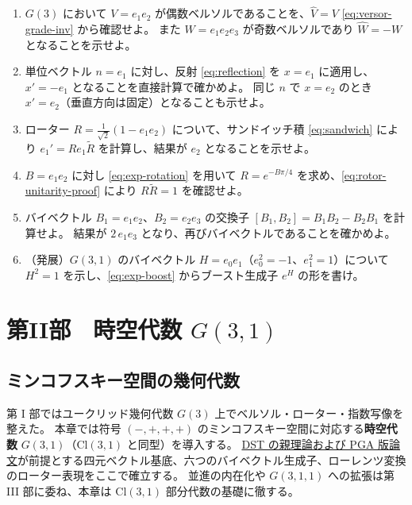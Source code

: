 \documentclass[dvipdfmx,a4paper,oneside]{jsbook}
\numberwithin{equation}{chapter}
\begin{document}
\begin{enumerate}[leftmargin=2em]
  \item \(G(3)\) において \(V = e_1 e_2\) が偶数ベルソルであることを、\(\widehat{V} = V\) \eqref{eq:versor-grade-inv} から確認せよ。
  また \(W = e_1 e_2 e_3\) が奇数ベルソルであり \(\widehat{W} = -W\) となることを示せよ。

  \item 単位ベクトル \(n = e_1\) に対し、反射 \eqref{eq:reflection} を \(x = e_1\) に適用し、\(x' = -e_1\) となることを直接計算で確かめよ。
  同じ \(n\) で \(x = e_2\) のとき \(x' = e_2\)（垂直方向は固定）となることも示せよ。

  \item ローター \(R = \tfrac{1}{\sqrt{2}}(1 - e_1 e_2)\) について、サンドイッチ積 \eqref{eq:sandwich} により \(e_1' = R e_1 \widetilde{R}\) を計算し、結果が \(e_2\) となることを示せよ。

  \item \(B = e_1 e_2\) に対し \eqref{eq:exp-rotation} を用いて \(R = e^{-B\pi/4}\) を求め、\eqref{eq:rotor-unitarity-proof} により \(R\widetilde{R}=1\) を確認せよ。

  \item バイベクトル \(B_1 = e_1 e_2\)、\(B_2 = e_2 e_3\) の交換子 \([B_1,B_2] = B_1 B_2 - B_2 B_1\) を計算せよ。
  結果が \(2\,e_1 e_3\) となり、再びバイベクトルであることを確かめよ。

  \item （発展）\(G(3,1)\) のバイベクトル \(H = e_0 e_1\)（\(e_0^2=-1\)、\(e_1^2=1\)）について \(H^2 = 1\) を示し、\eqref{eq:exp-boost} からブースト生成子 \(e^H\) の形を書け。
\end{enumerate}

\newpage

\part{\texorpdfstring{第II部　時空代数 \(G(3,1)\)}{第II部　時空代数 G(3,1)}}

\chapter{ミンコフスキー空間の幾何代数}

第 I 部ではユークリッド幾何代数 \(G(3)\) 上でベルソル・ローター・指数写像を整えた。
本章では符号 \((-,+,+,+)\) のミンコフスキー空間に対応する\textbf{時空代数} \(G(3,1)\)（\(\mathrm{Cl}(3,1)\) と同型）を導入する。
\hyperref[sec:sister-manuscripts]{DST の親理論および PGA 版論文}が前提とする四元ベクトル基底、六つのバイベクトル生成子、ローレンツ変換のローター表現をここで確立する。
並進の内在化や \(G(3,1,1)\) への拡張は第 III 部に委ね、本章は \(\mathrm{Cl}(3,1)\) 部分代数の基礎に徹する。
\end{document}
